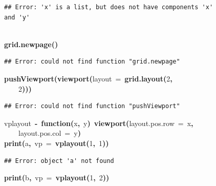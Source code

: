 \documentclass{elsarticle}
\makeatletter
\newcommand{\hlnumber}[1]{\textcolor[rgb]{0,0,0}{#1}}%
\newcommand{\hlfunctioncall}[1]{\textcolor[rgb]{.5,0,.33}{\textbf{#1}}}%
\newcommand{\hlkeyword}[1]{\textbf{#1}}%
\newcommand{\hlargument}[1]{\textcolor[rgb]{.69,.25,.02}{#1}}%
\newcommand{\hlformalargs}[1]{\hlargument{#1}}%
\newcommand{\hlassignement}[1]{\textbf{#1}}%
\newcommand{\hlsymbol}[1]{#1}%
\newcommand{\hlstd}[1]{\textcolor[rgb]{0,0,0}{#1}}%
\newenvironment{kframe}{%
 \def\FrameCommand##1{\hskip\@totalleftmargin \hskip-\fboxsep
 \colorbox{shadecolor}{##1}\hskip-\fboxsep
     \hskip-\linewidth \hskip-\@totalleftmargin \hskip\columnwidth}%
 \MakeFramed {\advance\hsize-\width
   \@totalleftmargin\z@ \linewidth\hsize
   \@setminipage}}%
 {\par\unskip\endMakeFramed}
\newenvironment{knitrout}{}{} %
\makeatother
\begin{document}
\begin{figure}
\begin{center}
\begin{knitrout}
{\begin{kframe}
\begin{verbatim}
## Error: 'x' is a list, but does not have components 'x' and 'y'
\end{verbatim}
\begin{flushleft}
\ttfamily\noindent
\hspace*{\fill}\\
\hlstd{}\hlfunctioncall{grid.newpage}\hlkeyword{(}\hlkeyword{)}\mbox{}
\normalfont
\end{flushleft}
\begin{verbatim}
## Error: could not find function "grid.newpage"
\end{verbatim}
\begin{flushleft}
\ttfamily\noindent
\hlfunctioncall{pushViewport}\hlkeyword{(}\hlfunctioncall{viewport}\hlkeyword{(}\hlargument{layout}{\ }\hlargument{=}{\ }\hlfunctioncall{grid.layout}\hlkeyword{(}\hlnumber{2}\hlkeyword{,}\hspace*{\fill}\\
\hlstd{}{\ }{\ }{\ }{\ }\hlnumber{2}\hlkeyword{)}\hlkeyword{)}\hlkeyword{)}\mbox{}
\normalfont
\end{flushleft}
\begin{verbatim}
## Error: could not find function "pushViewport"
\end{verbatim}
\begin{flushleft}
\ttfamily\noindent
\hlsymbol{vplayout}{\ }\hlassignement{\usebox{\hlnormalsizeboxlessthan}-}{\ }\hlkeyword{function}\hlkeyword{(}\hlformalargs{x}\hlkeyword{,}{\ }\hlformalargs{y}\hlkeyword{)}{\ }\hlfunctioncall{viewport}\hlkeyword{(}\hlargument{layout.pos.row}{\ }\hlargument{=}{\ }\hlsymbol{x}\hlkeyword{,}\hspace*{\fill}\\
\hlstd{}{\ }{\ }{\ }{\ }\hlargument{layout.pos.col}{\ }\hlargument{=}{\ }\hlsymbol{y}\hlkeyword{)}\hspace*{\fill}\\
\hlstd{}\hlfunctioncall{print}\hlkeyword{(}\hlsymbol{a}\hlkeyword{,}{\ }\hlargument{vp}{\ }\hlargument{=}{\ }\hlfunctioncall{vplayout}\hlkeyword{(}\hlnumber{1}\hlkeyword{,}{\ }\hlnumber{1}\hlkeyword{)}\hlkeyword{)}\mbox{}
\normalfont
\end{flushleft}
\begin{verbatim}
## Error: object 'a' not found
\end{verbatim}
\begin{flushleft}
\ttfamily\noindent
\hlfunctioncall{print}\hlkeyword{(}\hlsymbol{b}\hlkeyword{,}{\ }\hlargument{vp}{\ }\hlargument{=}{\ }\hlfunctioncall{vplayout}\hlkeyword{(}\hlnumber{1}\hlkeyword{,}{\ }\hlnumber{2}\hlkeyword{)}\hlkeyword{)}\mbox{}

\end{flushleft}
\end{kframe}}
\end{knitrout}
\end{center}
\end{figure}
\end{document}
